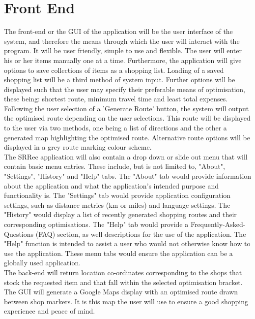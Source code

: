 \documentclass[10pt, a4paper, onecolumn]{scrartcl}
\begin{document}
	\section{Front End}
		
		The front-end or the GUI of the application will be the user interface of the system, and therefore the means through which the user will interact with the program. It will be user friendly, simple to use and flexible. The user will enter his or her items manually one at a time. Furthermore, the application will give options to save collections of items as a shopping list. Loading of a saved shopping list will be a third method of system input. Further options will be displayed such that the user may specify their preferable means of optimisation, these being: shortest route, minimum travel time and least total expenses. Following the user selection of a 'Generate Route' button, the system will output the optimised route depending on the user selections. This route will be displayed to the user via two methods, one being a list of directions and the other a generated map highlighting the optimised route. Alternative route options will be displayed in a grey route marking colour scheme. \\
		
		The SRRec application will also contain a drop down or slide out menu that will contain basic menu entries. These include, but is not limited to, "About", "Settings", "History" and "Help" tabs. The "About" tab would provide information about the application and what the application's intended purpose and functionality is. The "Settings" tab would provide application configuration settings, such as distance metrics (km or miles) and language settings. The "History" would display a list of recently generated shopping routes and their corresponding optimisations. The "Help" tab would provide a Frequently-Asked-Questions (FAQ) section, as well descriptions for the use of the application. The "Help" function is intended to assist a user who would not otherwise know how to use the application. These menu tabs would ensure the application can be a globally used application.  \\
		
		The back-end will return location co-ordinates corresponding to the shops that stock the requested item and that fall within the selected optimisation bracket. The GUI will generate a Google Maps display with an optimised route drawn between shop markers. It is this map the user will use to ensure a good shopping experience and peace of mind.  
	
\end{document}
